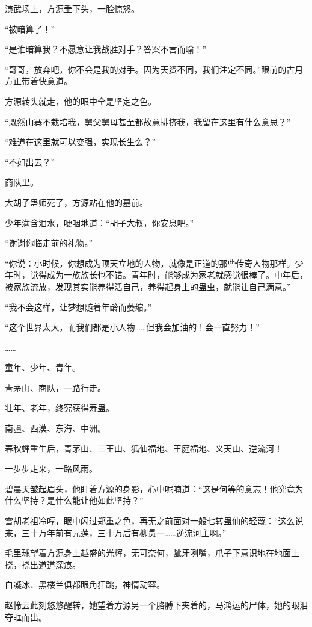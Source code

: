 \begin{this_body}
演武场上，方源垂下头，一脸惊怒。

“被暗算了！”

“是谁暗算我？不愿意让我战胜对手？答案不言而喻！”

“哥哥，放弃吧，你不会是我的对手。因为天资不同，我们注定不同。”眼前的古月方正带着快意道。

方源转头就走，他的眼中全是坚定之色。

“既然山寨不栽培我，舅父舅母甚至都故意排挤我，我留在这里有什么意思？”

“难道在这里就可以变强，实现长生么？”

“不如出去？”

商队里。

大胡子蛊师死了，方源站在他的墓前。

少年满含泪水，哽咽地道：“胡子大叔，你安息吧。”

“谢谢你临走前的礼物。”

“你说：小时候，你想成为顶天立地的人物，就像是正道的那些传奇人物那样。少年时，觉得成为一族族长也不错。青年时，能够成为家老就感觉很棒了。中年后，被家族流放，发现其实能养得活自己，养得起身上的蛊虫，就能让自己满意。”

“我不会这样，让梦想随着年龄而萎缩。”

“这个世界太大，而我们都是小人物……但我会加油的！会一直努力！”

……

童年、少年、青年。

青茅山、商队，一路行走。

壮年、老年，终究获得寿蛊。

南疆、西漠、东海、中洲。

春秋蝉重生后，青茅山、三王山、狐仙福地、王庭福地、义天山、逆流河！

一步步走来，一路风雨。

碧晨天皱起眉头，他盯着方源的身影，心中呢喃道：“这是何等的意志！他究竟为什么坚持？是什么能让他如此坚持？”

雪胡老祖冷哼，眼中闪过郑重之色，再无之前面对一般七转蛊仙的轻蔑：“这么说来，三十万年前有元莲，三十万后有柳贯一……逆流河主啊。”

毛里球望着方源身上越盛的光辉，无可奈何，龇牙咧嘴，爪子下意识地在地面上挠，挠出道道深痕。

白凝冰、黑楼兰俱都眼角狂跳，神情动容。

赵怜云此刻悠悠醒转，她望着方源另一个胳膊下夹着的，马鸿运的尸体，她的眼泪夺眶而出。


\end{this_body}
